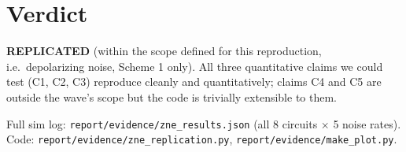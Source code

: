 \documentclass[11pt]{article}
\begin{document}
\section{Verdict}
\textbf{REPLICATED} (within the scope defined for this reproduction, i.e.\ depolarizing noise,
Scheme 1 only). All three quantitative claims we could test (C1, C2, C3) reproduce cleanly
and quantitatively; claims C4 and C5 are outside the wave's scope but the code is trivially
extensible to them.



\vfill
\noindent\small
Full sim log: \texttt{report/evidence/zne\_results.json} (all 8 circuits $\times$ 5 noise rates).\\
Code: \texttt{report/evidence/zne\_replication.py}, \texttt{report/evidence/make\_plot.py}.
\end{document}

